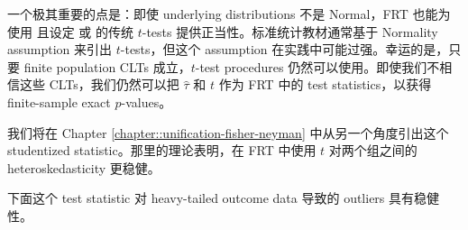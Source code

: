 一个极其重要的点是：即使 underlying distributions 不是 Normal，FRT 也能为使用  且设定  或  的传统 $t$-tests 提供正当性。标准统计教材通常基于 Normality assumption 来引出 $t$-tests，但这个 assumption 在实践中可能过强。幸运的是，只要 finite population CLTs 成立，$t$-test procedures 仍然可以使用。即使我们不相信这些 CLTs，我们仍然可以把 $\hat{\tau}$ 和 $t$ 作为 FRT 中的 test statistics，以获得 finite-sample exact $p$-values。


我们将在 Chapter \ref{chapter::unification-fisher-neyman} 中从另一个角度引出这个 studentized statistic。那里的理论表明，在 FRT 中使用 $t$ 对两个组之间的 heteroskedasticity 更稳健。


下面这个 test statistic 对 heavy-tailed outcome data 导致的 outliers 具有稳健性。




